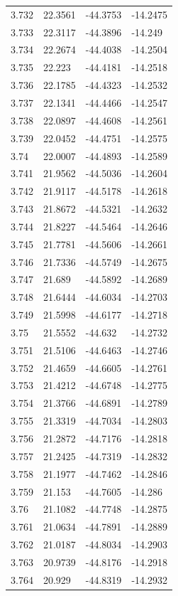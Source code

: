 \begin{tabular}{llll}
3.732 & 22.3561 & -44.3753 & -14.2475 \\
3.733 & 22.3117 & -44.3896 & -14.249 \\
3.734 & 22.2674 & -44.4038 & -14.2504 \\
3.735 & 22.223 & -44.4181 & -14.2518 \\
3.736 & 22.1785 & -44.4323 & -14.2532 \\
3.737 & 22.1341 & -44.4466 & -14.2547 \\
3.738 & 22.0897 & -44.4608 & -14.2561 \\
3.739 & 22.0452 & -44.4751 & -14.2575 \\
3.74 & 22.0007 & -44.4893 & -14.2589 \\
3.741 & 21.9562 & -44.5036 & -14.2604 \\
3.742 & 21.9117 & -44.5178 & -14.2618 \\
3.743 & 21.8672 & -44.5321 & -14.2632 \\
3.744 & 21.8227 & -44.5464 & -14.2646 \\
3.745 & 21.7781 & -44.5606 & -14.2661 \\
3.746 & 21.7336 & -44.5749 & -14.2675 \\
3.747 & 21.689 & -44.5892 & -14.2689 \\
3.748 & 21.6444 & -44.6034 & -14.2703 \\
3.749 & 21.5998 & -44.6177 & -14.2718 \\
3.75 & 21.5552 & -44.632 & -14.2732 \\
3.751 & 21.5106 & -44.6463 & -14.2746 \\
3.752 & 21.4659 & -44.6605 & -14.2761 \\
3.753 & 21.4212 & -44.6748 & -14.2775 \\
3.754 & 21.3766 & -44.6891 & -14.2789 \\
3.755 & 21.3319 & -44.7034 & -14.2803 \\
3.756 & 21.2872 & -44.7176 & -14.2818 \\
3.757 & 21.2425 & -44.7319 & -14.2832 \\
3.758 & 21.1977 & -44.7462 & -14.2846 \\
3.759 & 21.153 & -44.7605 & -14.286 \\
3.76 & 21.1082 & -44.7748 & -14.2875 \\
3.761 & 21.0634 & -44.7891 & -14.2889 \\
3.762 & 21.0187 & -44.8034 & -14.2903 \\
3.763 & 20.9739 & -44.8176 & -14.2918 \\
3.764 & 20.929 & -44.8319 & -14.2932 \\

\end{tabular}

